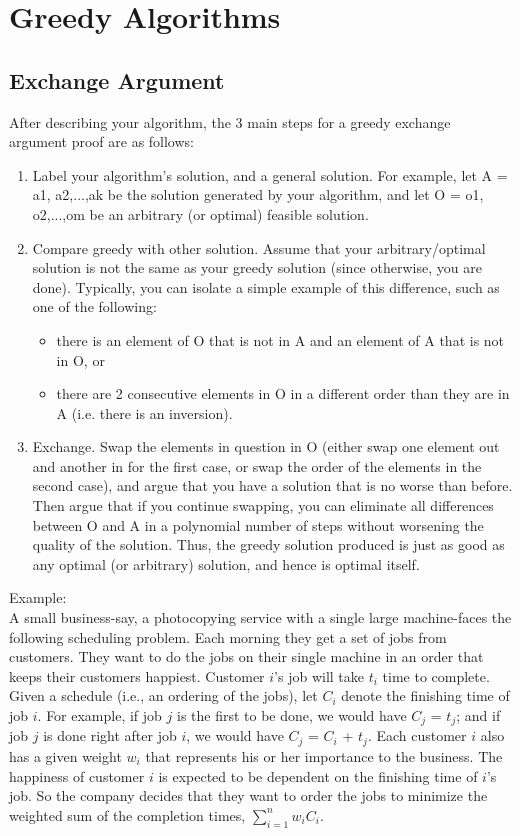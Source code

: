 \documentclass[]{article}
\begin{document}

\section{Greedy Algorithms}
\subsection{Exchange Argument}
After describing your algorithm, the 3 main steps for a greedy exchange argument proof are as follows:
\begin{enumerate}
    \item Label your algorithm’s solution, and a general solution. For example, let A = {a1, a2,...,ak} be the solution generated by your algorithm, and let O = {o1, o2,...,om} be an arbitrary (or optimal) feasible solution.
    \item Compare greedy with other solution. Assume that your arbitrary/optimal solution is not the same as your greedy solution (since otherwise, you are done). Typically, you can isolate a simple example of this difference, such as one of the following:
    \begin{itemize}
        \item there is an element of O that is not in A and an element of A that is not in O, or
        \item there are 2 consecutive elements in O in a different order than they are in A (i.e. there is an inversion).
    \end{itemize}
    \item Exchange. Swap the elements in question in O (either swap one element out and another in for the first case, or swap the order of the elements in the second case), and argue that you have a solution that is no worse than before. Then argue that if you continue swapping, you can eliminate all differences between O and A in a polynomial number of steps without worsening the quality of the solution. Thus, the greedy solution produced is just as good as any optimal (or arbitrary) solution, and hence is optimal itself.
\end{enumerate}
Example:\\
A small business-say, a photocopying service with a single large
machine-faces the following scheduling problem. Each morning they
get a set of jobs from customers. They want to do the jobs on their
single machine in an order that keeps their customers happiest.
Customer $i$'s job will take $t_{i}$ time to complete. Given a schedule (i.e.,
an ordering of the jobs), let $C_i$ denote the finishing time of job $i$. For
example, if job $j$ is the first to be done, we would have $C_j$ = $t_j$; and if
job $j$ is done right after job $i$, we would have $C_j$ = $C_i$ + $t_j$. Each
customer $i$ also has a given weight $w_i$ that represents his or her importance to the business. The happiness of customer $i$ is expected to be dependent on the finishing time of $i$'s job. So the company decides that they want to order the jobs to minimize the weighted sum of the completion times, $\sum_{i=1}^{n}w_iC_i$.\\
\end{document}
